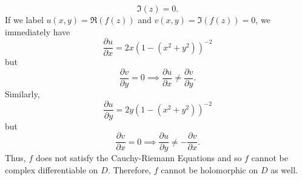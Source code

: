 \documentclass[a4paper]{article}
\begin{document}
\begin{solution}
\begin{enumerate}
        \[  \Im(z) = 0.  \]
        If we label \( u(x,y) = \Re(f(z)) \) and \( v(x,y) = \Im(f(z)) = 0 \), we immediately have
        \[  \frac{\partial u }{\partial x } = 2x (1 - (x^{2} + y^{2}))^{-2} \]
        but
        \[  \frac{\partial v }{\partial y }  = 0 \implies \frac{\partial u }{\partial x }  \neq \frac{\partial v }{\partial y }. \]
        Similarly, 
        \[  \frac{\partial u }{\partial y }  = 2y ( 1 - (x^{2} + y^{2}))^{-2} \]
        but 
        \[  \frac{\partial v }{\partial x } = 0 \implies \frac{\partial u }{\partial y }  \neq - \frac{\partial v }{\partial x }. \]
        Thus, \( f  \) does not satisfy the Cauchy-Riemann Equations and so \( f  \) cannot be complex differentiable on \( D  \). Therefore, \( f  \) cannot be holomorphic on \( D  \) as well.
\end{enumerate} 
\end{solution}
\end{document}
